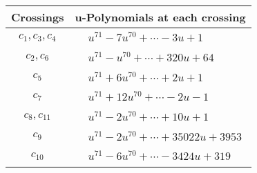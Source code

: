 \documentclass[1p]{elsarticle_modified}
\theoremstyle{definition}
\begin{document}
\begin{tabular}{m{50pt}|m{274pt}}
Crossings & \hspace{64pt}u-Polynomials at each crossing \\
\hline $$\begin{aligned}c_{1},c_{3},c_{4}\end{aligned}$$&$\begin{aligned}
&u^{71}-7 u^{70}+\cdots-3 u+1
\end{aligned}$\\
\hline $$\begin{aligned}c_{2},c_{6}\end{aligned}$$&$\begin{aligned}
&u^{71}- u^{70}+\cdots+320 u+64
\end{aligned}$\\
\hline $$\begin{aligned}c_{5}\end{aligned}$$&$\begin{aligned}
&u^{71}+6 u^{70}+\cdots+2 u+1
\end{aligned}$\\
\hline $$\begin{aligned}c_{7}\end{aligned}$$&$\begin{aligned}
&u^{71}+12 u^{70}+\cdots-2 u-1
\end{aligned}$\\
\hline $$\begin{aligned}c_{8},c_{11}\end{aligned}$$&$\begin{aligned}
&u^{71}-2 u^{70}+\cdots+10 u+1
\end{aligned}$\\
\hline $$\begin{aligned}c_{9}\end{aligned}$$&$\begin{aligned}
&u^{71}-2 u^{70}+\cdots+35022 u+3953
\end{aligned}$\\
\hline $$\begin{aligned}c_{10}\end{aligned}$$&$\begin{aligned}
&u^{71}-6 u^{70}+\cdots-3424 u+319
\end{aligned}$\\
\hline
\end{tabular}\\~\\
\newpage\renewcommand{\arraystretch}{1}
\end{document}
